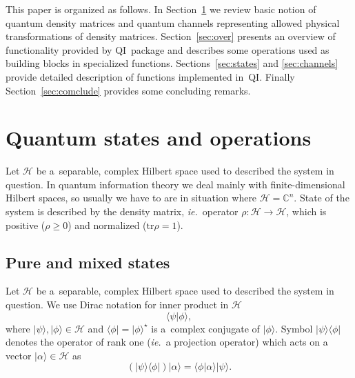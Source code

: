 \documentclass[final,3p,times]{elsarticle}
\newcommand{\ket}[1]{\ensuremath{|#1\rangle}}
\newcommand{\bra}[1]{\ensuremath{\langle#1|}}
\newcommand{\1}{{\rm 1\hspace{-0.9mm}l}}
\newcommand{\tr}{\mathrm{tr}}
\newcommand{\qi}{QI}
\newcommand{\HS}[1]{\ensuremath{\mathcal{#1}}} %
\newcommand{\Cplx}{\ensuremath{\mathbb{C}}}
\newcommand{\ie}{\emph{ie.}}
\newcommand{\iner}[2]{\braket{#1}{#2}}
\newcommand{\Iner}[2]{\iner{#1}{#2}}
\newcommand{\braket}[2]{\ensuremath{\langle#1|#2\rangle}}
\begin{document}
This paper is organized as follows. In Section~\ref{sec:qi-intro} we review
basic notion of quantum density matrices and quantum channels representing
allowed physical transformations of density matrices. Section~\ref{sec:over}
presents an overview of functionality provided by \qi\ package and describes
some operations used as building blocks in specialized functions.
Sections~\ref{sec:states} and \ref{sec:channels} provide detailed description of
functions implemented in~\qi. Finally Section~\ref{sec:comclude} provides some
concluding remarks.

\section{Quantum states and operations}\label{sec:qi-intro}
Let $\HS{H}$ be a~separable, complex Hilbert space used to described the system
in question. In quantum information theory we deal mainly with
finite-dimensional Hilbert spaces, so usually we have to are in situation where
$\HS{H}=\Cplx^n$. State of the system is described by the density matrix, \ie\
operator $\rho:\HS{H}\rightarrow\HS{H}$, which is positive ($\rho\geq0$) and
normalized ($\tr{\rho}=1$). 

\subsection{Pure and mixed states}
Let $\HS{H}$ be a~separable, complex Hilbert space\index{Hilbert space} used
to described the system in question. We use Dirac notation
\cite{dirac58principles} for inner product in $\HS{H}$
\begin{equation}
  \Iner{\psi}{\phi},
\label{eqn:dirac-iner}
\end{equation}
where $\ket{\psi},\ket{\phi}\in\HS{H}$ and $\bra{\phi} = \ket{\phi}^\star$ 
is a~complex conjugate of $\ket{\phi}$. Symbol $\ket{\psi}\bra{\phi}$ denotes
the operator of rank one (\ie\ a projection operator) which acts on a vector
$\ket{\alpha}\in\HS{H}$ as
\begin{equation}
\left(\ket{\psi}\bra{\phi}\right)\ket{\alpha} = \Iner{\phi}{\alpha}\ket{\psi}.
\label{eqn:dirac-proj}
\end{equation}
\end{document}
